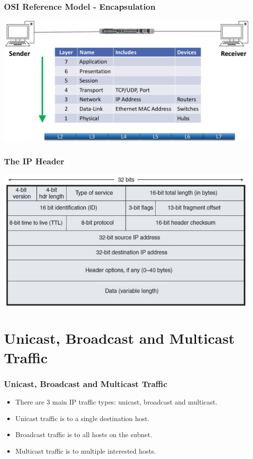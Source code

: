 \documentclass[pdflatex,compress]{beamer}
\begin{document}
\begin{frame}
	\frametitle{OSI Reference Model - Encapsulation}
	\begin{center}
		\includegraphics[width=\linewidth]{img/img08}
	\end{center}
\end{frame}

\begin{frame}
	\frametitle{The IP Header}
	\begin{center}
		\includegraphics[width=\linewidth]{img/img09}
	\end{center}
\end{frame}

\section{Unicast, Broadcast and Multicast Traffic}

\begin{frame}
	\frametitle{Unicast, Broadcast and Multicast Traffic}
	\begin{itemize}
		\item There are 3 main IP traffic types: unicast, broadcast and multicast.
		\item Unicast traffic is to a single destination host.
		\item Broadcast traffic is to all hosts on the subnet.
		\item Multicast traffic is to multiple interested hosts.
	\end{itemize}
\end{frame}
\end{document}
